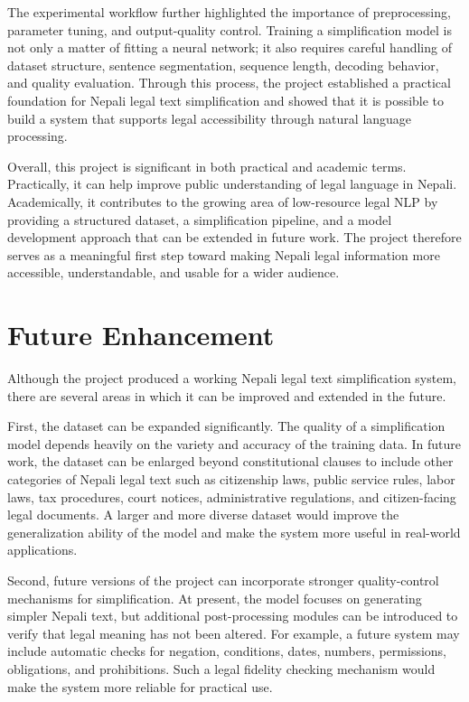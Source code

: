 \documentclass[12pt]{report}
\begin{document}
The experimental workflow further highlighted the importance of preprocessing, parameter tuning, and output-quality control. Training a simplification model is not only a matter of fitting a neural network; it also requires careful handling of dataset structure, sentence segmentation, sequence length, decoding behavior, and quality evaluation. Through this process, the project established a practical foundation for Nepali legal text simplification and showed that it is possible to build a system that supports legal accessibility through natural language processing.

Overall, this project is significant in both practical and academic terms. Practically, it can help improve public understanding of legal language in Nepali. Academically, it contributes to the growing area of low-resource legal NLP by providing a structured dataset, a simplification pipeline, and a model development approach that can be extended in future work. The project therefore serves as a meaningful first step toward making Nepali legal information more accessible, understandable, and usable for a wider audience.

\section{Future Enhancement}

Although the project produced a working Nepali legal text simplification system, there are several areas in which it can be improved and extended in the future.

First, the dataset can be expanded significantly. The quality of a simplification model depends heavily on the variety and accuracy of the training data. In future work, the dataset can be enlarged beyond constitutional clauses to include other categories of Nepali legal text such as citizenship laws, public service rules, labor laws, tax procedures, court notices, administrative regulations, and citizen-facing legal documents. A larger and more diverse dataset would improve the generalization ability of the model and make the system more useful in real-world applications.

Second, future versions of the project can incorporate stronger quality-control mechanisms for simplification. At present, the model focuses on generating simpler Nepali text, but additional post-processing modules can be introduced to verify that legal meaning has not been altered. For example, a future system may include automatic checks for negation, conditions, dates, numbers, permissions, obligations, and prohibitions. Such a legal fidelity checking mechanism would make the system more reliable for practical use.
\end{document}
